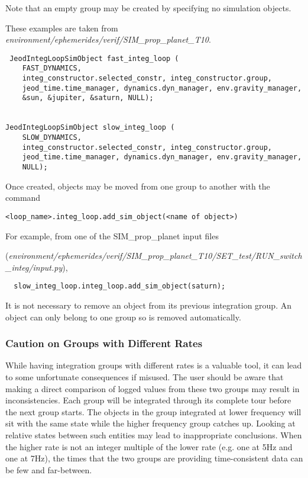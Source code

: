 Note that an empty group may be created by specifying no simulation objects.

These examples are taken from 
\textit{environment/ephemerides/verif/SIM\_prop\_planet\_T10}.
\begin{verbatim}
 JeodIntegLoopSimObject fast_integ_loop (
    FAST_DYNAMICS,
    integ_constructor.selected_constr, integ_constructor.group,
    jeod_time.time_manager, dynamics.dyn_manager, env.gravity_manager,
    &sun, &jupiter, &saturn, NULL);


JeodIntegLoopSimObject slow_integ_loop (
    SLOW_DYNAMICS,
    integ_constructor.selected_constr, integ_constructor.group,
    jeod_time.time_manager, dynamics.dyn_manager, env.gravity_manager,
    NULL);
\end{verbatim}


Once created, objects may be moved from one group to another with the command
\begin{verbatim}
<loop_name>.integ_loop.add_sim_object(<name of object>) 
\end{verbatim}

For example, from one of the SIM\_prop\_planet input files 

(\textit{environment/ephemerides/verif/SIM\_prop\_planet\_T10/SET\_test/RUN\_switch\_integ/input.py}),
\begin{verbatim}
  slow_integ_loop.integ_loop.add_sim_object(saturn);
\end{verbatim}
It is not necessary to remove an object from its previous integration group.  
An object can only belong to one group so is removed automatically.


\subsubsection{Caution on Groups with Different Rates}
While having integration groups with different rates is a valuable tool, it 
can 
lead to some unfortunate consequences if misused.  The user should be aware 
that making a direct comparison of logged values from these two groups may 
result in inconsistencies.  Each group will be integrated through its complete 
tour before the next group starts.  The objects in the group integrated at 
lower frequency will sit with the same state while the higher frequency group 
catches up.  Looking at relative states between such entities may lead to 
inappropriate conclusions.  When the higher rate is not an integer multiple of 
the lower rate (e.g. one at 5Hz and one at 7Hz), the times that the two groups 
are providing time-consistent data can be few and far-between.

